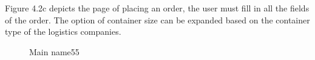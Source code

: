 \documentclass[12pt]{ksthesis}
\begin{document}
\begin{thesis}
{Figure 4.2c depicts the page of placing an order, the user must fill in all the fields of the order. The option of container size can be expanded based on the container type of the logistics companies. 



\begin{figure}[H]
\centering  %
\caption{Main name55}
\label{Fig.main}
\end{figure}

}
\end{thesis}
\end{document}
